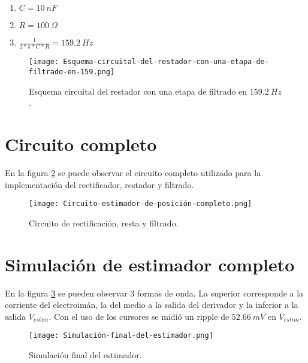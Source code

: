\begin{enumerate}
	\item  $C=10\: nF$
	
	\item  $R=100\:\Omega$
	
	\item  $\frac{1}{2*\pi *C*R}=159.2\: Hz$
\end{enumerate}

\begin{figure}[H]
	\centering
	\texttt{[image: Esquema-circuital-del-restador-con-una-etapa-de-filtrado-en-159.png]}
	\caption{Esquema circuital del restador con una etapa de filtrado en $159.2\: Hz$.}
	\label{fig:img_Esquema-circuital-del-restador-con-una-etapa-de-filtrado-en-159}
\end{figure}

\section{Circuito completo}

\noindent En la figura \ref{fig:img_Circuito_estimador_de_posición_completo} se puede observar el circuito completo utilizado para la implementaci\'{o}n del rectificador, restador y filtrado.

\begin{figure}[H]
	\centering
	\texttt{[image: Circuito-estimador-de-posición-completo.png]}
	\caption{Circuito de rectificación, resta y filtrado.}
	\label{fig:img_Circuito_estimador_de_posición_completo}
\end{figure}

\section{Simulaci\'{o}n de estimador completo}

\noindent En la figura \ref{fig:img_Simulación_final_del_estimado} se pueden observar 3 formas de onda. La superior corresponde a la corriente del electroim\'{a}n, la del medio a la salida del derivador y la inferior a la salida $V_{estim}$. Con el uso de los cursores se midi\'{o} un ripple de $52.66\:mV $ en $V_{estim}$.

\begin{figure}[H]
	\centering
	\texttt{[image: Simulación-final-del-estimador.png]}
	\caption{Simulación final del estimador.}
	\label{fig:img_Simulación_final_del_estimado}
\end{figure}

